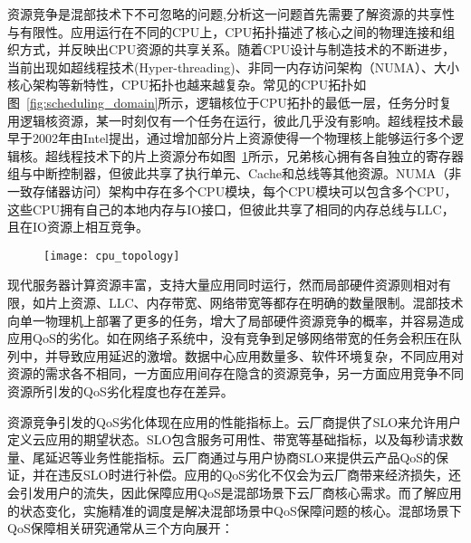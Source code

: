 资源竞争是混部技术下不可忽略的问题,分析这一问题首先需要了解资源的共享性与有限性。应用运行在不同的CPU上，CPU拓扑描述了核心之间的物理连接和组织方式，并反映出CPU资源的共享关系。随着CPU设计与制造技术的不断进步，当前出现如超线程技术(Hyper-threading)、非同一内存访问架构（NUMA）、大小核心架构等新特性，CPU拓扑也越来越复杂。常见的CPU拓扑如图~\ref{fig:scheduling_domain}所示，逻辑核位于CPU拓扑的最低一层，任务分时复用逻辑核资源，某一时刻仅有一个任务在运行，彼此几乎没有影响。超线程技术最早于2002年由Intel提出，通过增加部分片上资源使得一个物理核上能够运行多个逻辑核。超线程技术下的片上资源分布如图~\ref{fig:cpu_topology}所示，兄弟核心拥有各自独立的寄存器组与中断控制器，但彼此共享了执行单元、Cache和总线等其他资源。NUMA（非一致存储器访问）架构中存在多个CPU模块，每个CPU模块可以包含多个CPU，这些CPU拥有自己的本地内存与IO接口，但彼此共享了相同的内存总线与LLC，且在IO资源上相互竞争。

\begin{figure}[!htbp]
    \centering
    \texttt{[image: cpu\_topology]}
    \label{fig:cpu_topology}
\end{figure}

现代服务器计算资源丰富，支持大量应用同时运行，然而局部硬件资源则相对有限，如片上资源、LLC、内存带宽、网络带宽等都存在明确的数量限制。混部技术向单一物理机上部署了更多的任务，增大了局部硬件资源竞争的概率，并容易造成应用QoS的劣化。如在网络子系统中，没有竞争到足够网络带宽的任务会积压在队列中，并导致应用延迟的激增。数据中心应用数量多、软件环境复杂，不同应用对资源的需求各不相同，一方面应用间存在隐含的资源竞争，另一方面应用竞争不同资源所引发的QoS劣化程度也存在差异。

资源竞争引发的QoS劣化体现在应用的性能指标上。云厂商提供了SLO来允许用户定义云应用的期望状态。SLO包含服务可用性、带宽等基础指标，以及每秒请求数量、尾延迟等业务性能指标。云厂商通过与用户协商SLO来提供云产品QoS的保证，并在违反SLO时进行补偿。应用的QoS劣化不仅会为云厂商带来经济损失，还会引发用户的流失，因此保障应用QoS是混部场景下云厂商核心需求。而了解应用的状态变化，实施精准的调度是解决混部场景中QoS保障问题的核心。混部场景下QoS保障相关研究通常从三个方向展开：

